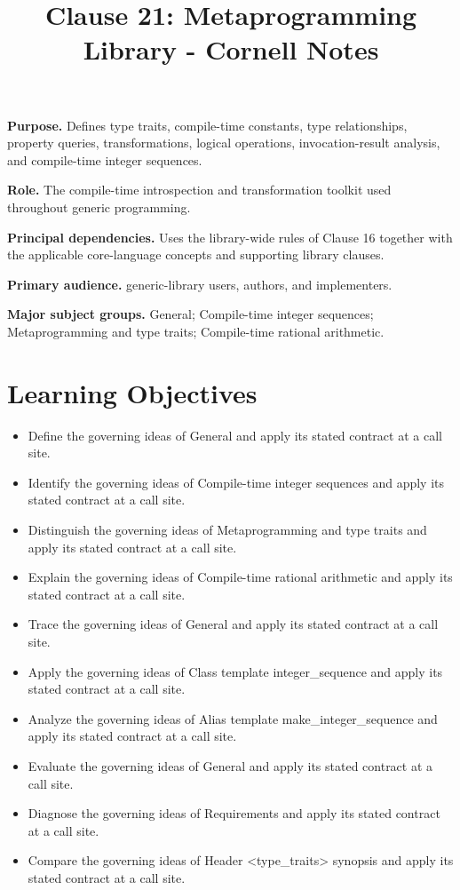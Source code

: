 \documentclass[11pt,letterpaper]{article}
\title{Clause 21: Metaprogramming Library - Cornell Notes}
\author{}
\date{}
\begin{document}
\maketitle
\begin{CornellReferenceOrientationBox}
\textbf{Purpose.} Defines type traits, compile-time constants, type relationships, property queries, transformations, logical operations, invocation-result analysis, and compile-time integer sequences.
\par\textbf{Role.} The compile-time introspection and transformation toolkit used throughout generic programming.
\par\textbf{Principal dependencies.} Uses the library-wide rules of Clause 16 together with the applicable core-language concepts and supporting library clauses.
\par\textbf{Primary audience.} generic-library users, authors, and implementers.
\par\textbf{Major subject groups.} General; Compile-time integer sequences; Metaprogramming and type traits; Compile-time rational arithmetic.
\end{CornellReferenceOrientationBox}
\section{Learning Objectives}
\begin{itemize}[label=\textcolor{CornellReferenceTeal}{$\blacktriangleright$}]
\item Define the governing ideas of General and apply its stated contract at a call site.
\item Identify the governing ideas of Compile-time integer sequences and apply its stated contract at a call site.
\item Distinguish the governing ideas of Metaprogramming and type traits and apply its stated contract at a call site.
\item Explain the governing ideas of Compile-time rational arithmetic and apply its stated contract at a call site.
\item Trace the governing ideas of General and apply its stated contract at a call site.
\item Apply the governing ideas of Class template integer\_\allowbreak{}sequence and apply its stated contract at a call site.
\item Analyze the governing ideas of Alias template make\_\allowbreak{}integer\_\allowbreak{}sequence and apply its stated contract at a call site.
\item Evaluate the governing ideas of General and apply its stated contract at a call site.
\item Diagnose the governing ideas of Requirements and apply its stated contract at a call site.
\item Compare the governing ideas of Header <type\_\allowbreak{}traits> synopsis and apply its stated contract at a call site.
\end{itemize}
\end{document}
